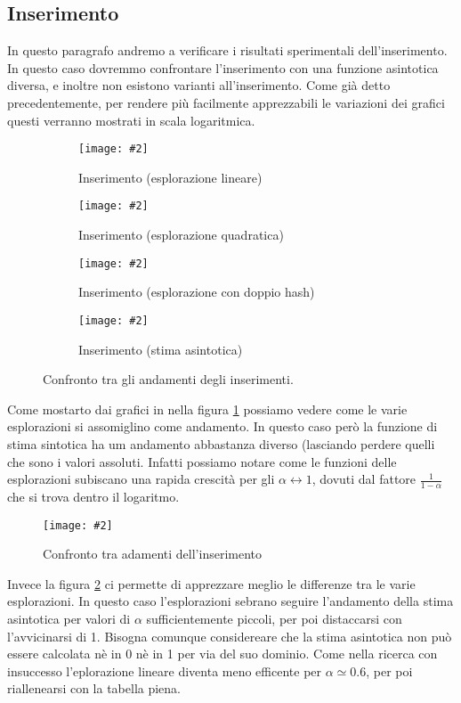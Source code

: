 \documentclass{article}
\newcommand{\image}[3][1]{
	\centering
	\texttt{[image: \#2]}
	\caption{#3}
}
\begin{document}
\subsection{Inserimento}
In questo paragrafo andremo a verificare i risultati sperimentali dell'inserimento. In questo caso dovremmo confrontare l'inserimento con una funzione asintotica diversa, e inoltre non esistono varianti all'inserimento. Come già detto precedentemente, per rendere più facilmente apprezzabili le variazioni dei grafici questi verranno mostrati in scala logaritmica.

\begin{figure}[H]
\begin{subfigure}[b]{0.5\textwidth}
\image{Inserimento_Lineare_scala_logaritmica}{Inserimento (esplorazione lineare)}
\end{subfigure}
\begin{subfigure}[b]{0.5\textwidth}
\image{Inserimento_Quadratico_scala_logaritmica}{Inserimento (esplorazione quadratica)}
\end{subfigure}
\begin{subfigure}[b]{0.5\textwidth}
\image{Inserimento_Doppio_scala_logaritmica}{Inserimento (esplorazione con doppio hash)}
\end{subfigure}
\begin{subfigure}[b]{0.5\textwidth}
\image{Inserimento_Asintotica_scala_logaritmica}{Inserimento (stima asintotica)}
\end{subfigure}
\caption{Confronto tra gli andamenti degli inserimenti.}
\label{fig:Inserimento_quartetto}
\end{figure}

Come mostarto dai grafici in nella figura \ref{fig:Inserimento_quartetto} possiamo vedere come le varie esplorazioni si assomiglino come andamento. In questo caso però la funzione di stima sintotica ha um andamento abbastanza diverso (lasciando perdere quelli che sono i valori assoluti. Infatti possiamo notare come le funzioni delle esplorazioni subiscano una rapida crescità per gli $\alpha \longleftrightarrow 1$, dovuti dal fattore $\frac{1}{1 - \alpha}$ che si trova dentro il logaritmo. 

\begin{figure}[H]
\image[0.75]{Inserimento_Confronto_asintotico_scala_logaritmica}{Confronto tra adamenti dell'inserimento}
\label{fig:Inserimento_Confronto_asintotico_scala_logaritmica}
\end{figure}

Invece la figura \ref{fig:Inserimento_Confronto_asintotico_scala_logaritmica} ci permette di apprezzare meglio le differenze tra le varie esplorazioni. In questo caso l'esplorazioni sebrano seguire l'andamento della stima asintotica per valori di $\alpha$ sufficientemente piccoli, per poi distaccarsi con l'avvicinarsi di 1. Bisogna comunque considereare che la stima asintotica non può essere calcolata nè in 0 nè in 1 per via del suo dominio.
Come nella ricerca con insuccesso l'eplorazione lineare diventa meno efficente per $\alpha \simeq 0.6$, per poi riallenearsi con la tabella piena.
\end{document}
